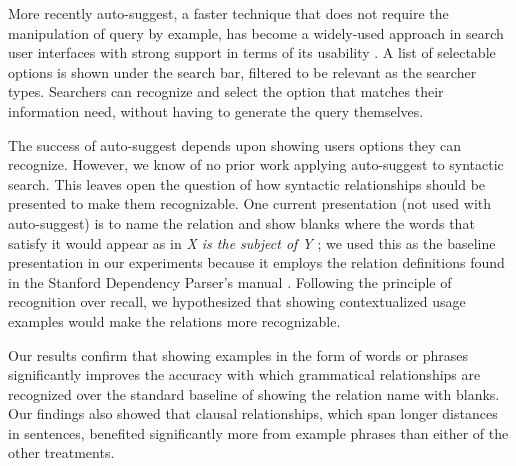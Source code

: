 More recently auto-suggest, a faster technique that does not require the manipulation of query by example, has become a widely-used approach in search user interfaces with strong support in terms of its usability \cite{anick2008longitudinal,ward2012autocomplete,jagadish2007making}. A list of selectable options is shown under the search bar, filtered to be relevant as the searcher types. Searchers can recognize and select the option that matches their information need, without having to generate the query themselves.

The success of auto-suggest depends upon showing users options they can recognize. However, we know of no prior work applying auto-suggest to syntactic search. This leaves open the question of how syntactic relationships should be presented to make them recognizable.
One current presentation (not used with auto-suggest) is to name the relation and show blanks where the words that satisfy it would appear as in \emph{X is the subject of Y} \cite{muralidharan2013supporting}; we used this as the baseline presentation in our experiments because it employs the relation definitions found in the Stanford Dependency Parser's manual \cite{de2006generating}. Following the principle of recognition over recall, we hypothesized that showing contextualized usage examples would make the relations more recognizable.



Our results confirm that showing examples in the form of words or phrases significantly improves the accuracy with which grammatical relationships are recognized over the standard baseline of showing the relation name with blanks. Our findings also showed that clausal relationships, which span longer distances in sentences, benefited significantly more from example phrases than either of the other treatments.


